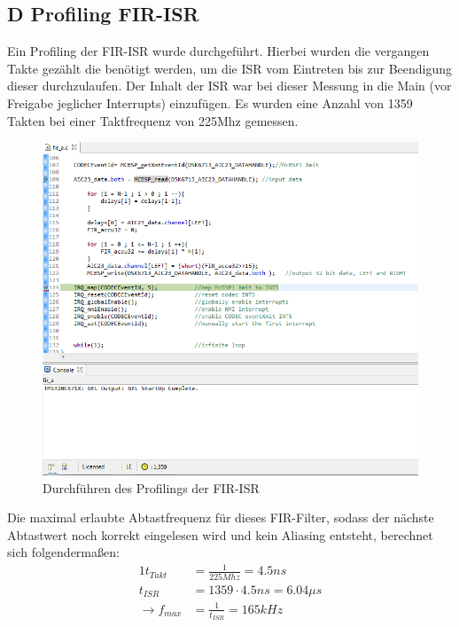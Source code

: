 \clearpage

\subsection{D Profiling FIR-ISR}
\noindent Ein Profiling der FIR-ISR wurde durchgeführt. Hierbei wurden die vergangen Takte gezählt die benötigt werden, um die ISR vom Eintreten bis zur Beendigung dieser durchzulaufen. Der Inhalt der ISR war bei dieser Messung in die Main (vor Freigabe jeglicher Interrupts) einzufügen. Es wurden eine Anzahl von 1359 Takten bei einer Taktfrequenz von 225Mhz gemessen.

\begin{figure}[h]
	\centering
	\includegraphics[width=0.9\linewidth]{Bilder/Attachment_D_Profiling}
	\caption{Durchführen des Profilings der FIR-ISR}
	\label{fig:Attachment_D_Profiling}
\end{figure}

\noindent Die maximal erlaubte Abtastfrequenz für dieses FIR-Filter, sodass der nächste Abtastwert noch korrekt eingelesen wird und kein Aliasing entsteht, berechnet sich folgendermaßen:\\

\begin{alignat}{1}
t_{Takt} &= \frac{1}{225Mhz} = 4.5ns \\
t_{ISR}  &= 1359 \cdot 4.5ns = 6.04\mu s \\
\rightarrow f_{max} &= \frac{1}{t_{ISR}} = 165 kHz
\end{alignat}

